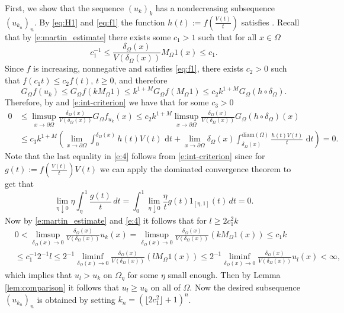 \documentclass[a4paper,12pt,draft]{article}
\theoremstyle{plain}
\theoremstyle{definition}
\numberwithin{equation}{section}
\renewcommand{\le}{\leqslant}
\renewcommand{\leq}{\leqslant}
\renewcommand{\ge}{\geqslant}
\newcommand{\1}{1}
\newcommand{\dt} {\, \mathrm{d}t}
\begin{document}
First, we show that the sequence $(u_k)_k$ has a nondecreasing subsequence $(u_{k_n})_n$. By \eqref{eq:H1} and \eqref{eq:f1} the function $h(t):= f(\tfrac{V(t)}t)$ satisfies \cite[Condition \textbf{(U)}]{BVW}. Recall that by \eqref{e:martin_estimate} there exists some $c_1>1$ such that for all $x\in\Omega$
\begin{equation*}
c_1^{-1} \le \frac{\delta_\Omega(x)}{V(\delta_\Omega(x))} M_\Omega 1 (x) \le c_1.
\end{equation*}
Since $f$ is increasing, nonnegative and satisfies \eqref{eq:f1}, there exists $c_2>0$ such that $f(c_1 t)\le c_2 f(t)$, $t\ge 0$, and therefore
$$
G_\Omega f(u_k)\leq  G_\Omega f(k M_\Omega1)\le k^{1+M}G_{\Omega}f(M_{\Omega}1)
\leq c_2 k^{1+M}G_\Omega(h\circ\delta_\Omega). 
$$
Therefore, by \cite[Proposition 4.1]{BVW} and \eqref{e:int-criterion} we have that for some $c_3>0$
\begin{align}\label{e:4}
0&\leq\limsup_{x\to\partial\Omega} \frac{\delta_\Omega(x)}{V(\delta_\Omega(x))}G_\Omega f_{u_k}(x)\leq c_2  k^{1+M} \limsup_{x\to\partial\Omega} \frac{\delta_\Omega(x)}{V(\delta_\Omega(x))}G_\Omega(h\circ\delta_\Omega)(x)\nonumber \\
&\leq c_3 k^{1+M} \left(\lim_{x\to\partial\Omega}\int_0^{\delta_\Omega(x)}h(t)V(t)\,\dt+\lim_{x\to\partial\Omega}\delta_\Omega(x)\int_{\delta_\Omega(x)}^{\text{diam}(\Omega)} \frac{h(t)V(t)}t\,\dt\right)=0.
\end{align}
Note that the last equality in \eqref{e:4} follows from \eqref{e:int-criterion} since for $g(t):=f\left(\frac{V(t)}{t}\right) V(t)$ we can apply the dominated convergence theorem to get that
$$
\lim_{\eta\downarrow 0} \eta\int_{\eta}^1 \frac{ g(t)}{t}\, dt= \int_{0}^1 \lim_{\eta\downarrow 0}\frac{ \eta}{t}g(t)1_{[\eta,1]}(t)\, dt=0.
$$
Now by \eqref{e:martin_estimate} and \eqref{e:4} it follows that for $l\ge 2c_1^2k$
\begin{equation}\label{eq:subseq}
\begin{split}
&0<\limsup_{\delta_\Omega(x)\to 0} \frac{\delta_\Omega(x)}{V(\delta_\Omega(x))} u_k(x)=\limsup_{\delta_\Omega(x)\to 0} \frac{\delta_\Omega(x)}{V(\delta_\Omega(x))} (k M_\Omega 1 (x) )\le c_1k \\
&\le c_1^{-1}2^{-1}l \le 2^{-1} \liminf_{\delta_\Omega(x)\to 0} \frac{\delta_\Omega(x)}{V(\delta_\Omega(x))} (l M_\Omega 1(x))\leq 2^{-1}\liminf_{\delta_\Omega(x)\to 0} \frac{\delta_\Omega(x)}{V(\delta_\Omega(x))}u_l(x)<\infty,
\end{split}
\end{equation}
which implies that $u_l>u_k$ on $\Omega_\eta$ for some $\eta$ small enough. Then by Lemma \ref{lem:comparison} it follows that $u_l\ge u_k$ on all of $\Omega$. Now the desired subsequence $(u_{k_n})_n$ is obtained by setting $k_n=(\lfloor 2c_1^2\rfloor +1)^n$.
\end{document}
